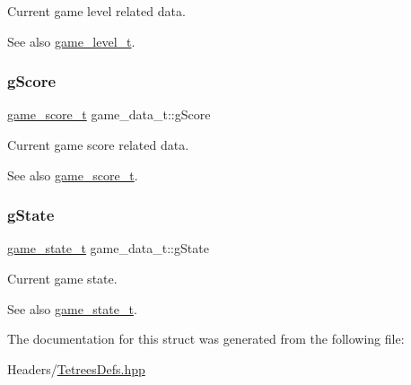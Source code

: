 Current game level related data. \begin{DoxySeeAlso}{See also}
\mbox{\hyperlink{structgame__level__t}{game\+\_\+level\+\_\+t}}. 
\end{DoxySeeAlso}
\mbox{\label{structgame__data__t_a70e04b66160685cc84bcdd30edb97e46}} 
\subsubsection{\texorpdfstring{g\+Score}{gScore}}
{\footnotesize\ttfamily \mbox{\hyperlink{structgame__score__t}{game\+\_\+score\+\_\+t}} game\+\_\+data\+\_\+t\+::g\+Score}

Current game score related data. \begin{DoxySeeAlso}{See also}
\mbox{\hyperlink{structgame__score__t}{game\+\_\+score\+\_\+t}}. 
\end{DoxySeeAlso}
\mbox{\label{structgame__data__t_a48253f7b6212e0ff99d5d5960b79476d}} 
\subsubsection{\texorpdfstring{g\+State}{gState}}
{\footnotesize\ttfamily \mbox{\hyperlink{TetreesDefs_8hpp_aebae08b2e3a36f1452b33acaf1eaab40}{game\+\_\+state\+\_\+t}} game\+\_\+data\+\_\+t\+::g\+State}

Current game state. \begin{DoxySeeAlso}{See also}
\mbox{\hyperlink{TetreesDefs_8hpp_aebae08b2e3a36f1452b33acaf1eaab40}{game\+\_\+state\+\_\+t}}. 
\end{DoxySeeAlso}


The documentation for this struct was generated from the following file\+:\begin{DoxyCompactItemize}
\item 
Headers/\mbox{\hyperlink{TetreesDefs_8hpp}{Tetrees\+Defs.\+hpp}}\end{DoxyCompactItemize}
